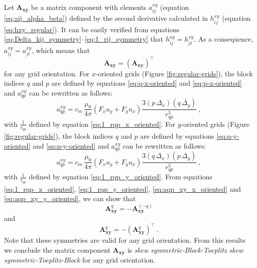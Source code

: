 \documentclass[manuscript]{geophysics}
\begin{document}
Let $\mathbf{A}_{\boldsymbol{xy}}$ be a matrix component with elements
$a^{xy}_{ij}$ (equation \ref{eq:aij_alpha_beta}) defined by the second derivative calculated in
$h^{xy}_{ij}$ (equation \ref{eq:hxy_regular}). It can be easily verified from equations
\ref{eq:Delta_kij_symmetry}--\ref{eq:1_rij_symmetry} that $h^{xy}_{ij} = h^{xy}_{ji}$.
As a consequence, $a^{xy}_{ij} = a^{xy}_{ji}$, which means that 
\begin{equation}
	\mathbf{A}_{\boldsymbol{xy}} = \left( \mathbf{A}_{\boldsymbol{xy}} \right)^{\top}
	\label{eq:Axy_symmetry}
\end{equation}
for any grid orientation.
For $x$-oriented grids (Figure \ref{fig:regular-grids}), the block indices $q$ and $p$ are defined 
by equations \ref{eq:q-x-oriented} and 
\ref{eq:p-x-oriented} and $a^{xy}_{qp}$ can be rewritten as follows:
\begin{equation}
	a^{xy}_{qp} = c_{m} \, \frac{\mu_{0}}{4\pi} 
	\left( F_{x} u_{y} + F_{y} u_{x} \right) \frac{3 \left( p \, \Delta_{x} \right)\left( q \, \Delta_{y} \right)}{r_{qp}^{5}}
	\: ,
	\label{eq:aqp_xy_x_oriented}
\end{equation}
with $\tfrac{1}{r_{qp}}$ defined by equation \ref{eq:1_rqp_x_oriented}.
For $y$-oriented grids (Figure \ref{fig:regular-grids}), the block indices $q$ and $p$ are 
defined by equations \ref{eq:q-y-oriented} and 
\ref{eq:p-y-oriented} and $a^{xy}_{qp}$ can be rewritten as follows:
\begin{equation}
	a^{xy}_{qp} = c_{m} \, \frac{\mu_{0}}{4\pi} 
	\left( F_{x} u_{y} + F_{y} u_{x} \right) \frac{3 \left( q \, \Delta_{x} \right)\left( p \, \Delta_{y} \right)}{r_{qp}^{5}} \: ,
	\label{eq:aqp_xy_y_oriented}
\end{equation}
with $\tfrac{1}{r_{qp}}$ defined by equation \ref{eq:1_rqp_y_oriented}.
From equations \ref{eq:1_rqp_x_oriented}, \ref{eq:1_rqp_y_oriented}, \ref{eq:aqp_xy_x_oriented} 
and \ref{eq:aqp_xy_y_oriented}, we can show that
\begin{equation}
	\mathbf{A}_{\boldsymbol{xy}}^{q} = -\mathbf{A}_{\boldsymbol{xy}}^{(-q)}
	\label{eq:Axy_q_external_block_symmetry}
\end{equation}
and 
\begin{equation}
	\mathbf{A}_{\boldsymbol{xy}}^{q} = -\left( \mathbf{A}_{\boldsymbol{xy}}^{q} \right)^{\top} \: .
	\label{eq:Axy_q_internal_block_symmetry}
\end{equation}
Note that these symmetries are valid for any grid orientation.
From this results we conclude the matrix component 
$\mathbf{A}_{\boldsymbol{xy}}$ is \textit{skew symmetric-Block-Toeplitz skew symmetric-Toeplitz-Block} 
for any grid orientation.
\end{document}
